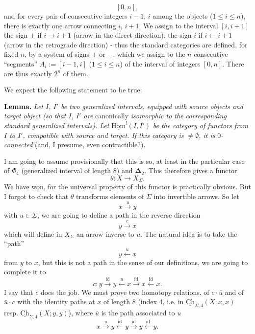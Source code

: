\documentclass[11pt]{article}
\newcommand{\printedpage}[1]{\marginpar{\footnotesize p.~#1}}
\newcommand{\msp}[1]{\marginpar{\footnotesize [#1]}}
\newcommand{\uCh}{\underline{\mathrm{Ch}}}
\newcommand{\uHom}{\underline{\mathrm{Hom}}}
\newcommand{\bDelta}{\boldsymbol{\Delta}}
\begin{document}
\[
[0,n],
\]
and for every pair of consecutive integers $i-1$, $i$ among the objects ($1 \leq i \leq n$), there is exactly one arrow connecting $i$, $i+1$. We assign to the interval $[i,i+1]$ the sign $+$ if $i \longrightarrow i+1$ (arrow in the direct direction), the sign $i$ if $i \longleftarrow i+1$ (arrow in the retrograde direction) - thus the standard categories are defined, for fixed $n$, by a system of signs $+$ or $-$, which we assign to the $n$ consecutive ``segments'' $A_i := [i-1,i]$ ($1 \leq i \leq n$) of the interval of integers $[0,n]$. There are thus exactly $2^n$ of them.

We expect the following statement to be true:

\textbf{Lemma.} \textit{Let $I$, $I'$ be two generalized intervals, equipped with source objects and target object (so that $I$, $I'$ are} canonically \textit{isomorphic to the corresponding standard generalized intervals). Let} $\uHom^!(I,I')$ %
\msp{page 26}\textit{be the category of functors from $I$ to $I'$, compatible with source and target. If this category is $\neq \emptyset$, it is} 0\textit{-connected} (and, I presume, even contractible?).

I am going to assume provisionally that this is so, at least in the particular case of $\Phi_4$ (generalized interval of length 8) and $\bDelta_2$. This therefore gives a functor
\[
\theta : X \longrightarrow X_\Sigma.
\]
We have won, for the universal property of this functor is practically obvious. But I forgot to check that $\theta$ transforms elements of $\Sigma$ into invertible arrows. So let
\[
x \xrightarrow{u} y
\]
with $u \in \Sigma$, we are going to define a path in the reverse direction
\[
y \xrightarrow{c} x
\]
which will define in $X_\Sigma$ an arrow inverse to $u$. The natural idea is to take the ``path''
\[
y \xleftarrow{u} x
\]
\printedpage{17}
from $y$ to $x$, but this is not a path in the sense of our definitions, we are going to complete it to
\[
c : y \xrightarrow{\mathrm{id}} y \xleftarrow{u} x \xrightarrow{\mathrm{id}} x \xleftarrow{\mathrm{id}} x.
\]
I say that $c$ does the job. We must prove two homotopy relations, of $c \cdot \bar{u}$ and of $\bar{u} \cdot c$ with the identity paths at $x$ of length 8 (index 4, i.e. in $\uCh_{\Sigma,4}(X;x,x)$ resp. $\uCh_{\Sigma,4}(X;y,y)$),
\msp{page 27}where $\bar{u}$ is the path associated to $u$
\[
x \xrightarrow{u} y \xleftarrow{\mathrm{id}} y \xrightarrow{\mathrm{id}} y \xleftarrow{\mathrm{id}} y.
\]
\end{document}
